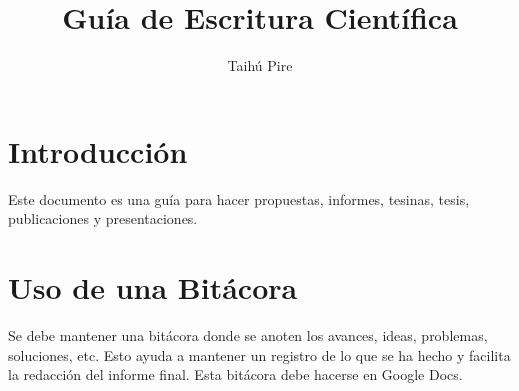 \documentclass[a4paper,	11pt]{article}
\begin{document}
\title{Guía de Escritura Científica}
\author{Taihú Pire}


\maketitle

\tableofcontents

\section{Introducción}

Este documento es una guía para hacer propuestas, informes, tesinas, tesis, publicaciones y presentaciones.

\section{Uso de una Bitácora}
Se debe mantener una bitácora donde se anoten los avances, ideas, problemas, soluciones, etc. Esto ayuda a mantener un registro de lo que se ha hecho y facilita la redacción del informe final. Esta bitácora debe hacerse en Google Docs.
\end{document}
